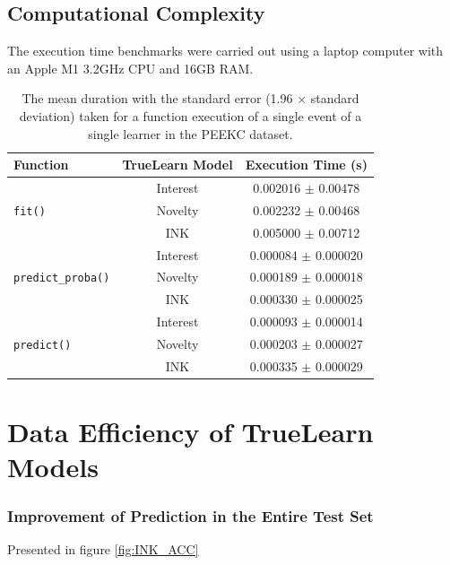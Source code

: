 \documentclass[letterpaper]{article} %
\begin{document}
\subsection{Computational Complexity}

The execution time benchmarks were carried out using a laptop computer with an Apple M1 3.2GHz CPU and 16GB RAM.

\begin{table}[h!] \footnotesize
\caption{The mean duration with the standard error (1.96 $\times$ standard deviation) taken for a function execution of a single event of a single learner in the PEEKC dataset.}
\centering
\begin{tabular}{l c c}
  \hline
  Function & TrueLearn Model & Execution Time (s) \\
  \hline
  & Interest & 0.002016 $\pm$ 0.00478
  \\
  \texttt{fit()} & Novelty & 0.002232 $\pm$ 0.00468 \\
   & INK & 0.005000 $\pm$ 0.00712 \\
   \hline
  & Interest & 0.000084 $\pm$ 0.000020   \\
  \texttt{predict\_proba()} & Novelty & 0.000189 $\pm$ 0.000018 \\
   & INK & 0.000330 $\pm$ 0.000025 \\
   \hline
    & Interest & 0.000093 $\pm$  0.000014 \\
  \texttt{predict()} & Novelty & 0.000203 $\pm$  0.000027 \\
   & INK & 0.000335 $\pm$  0.000029  \\
   \hline
\end{tabular}
\end{table}

\section{Data Efficiency of TrueLearn Models}


\subsubsection{Improvement of Prediction in the Entire Test Set}

Presented in figure \ref{fig:INK_ACC}
\end{document}
